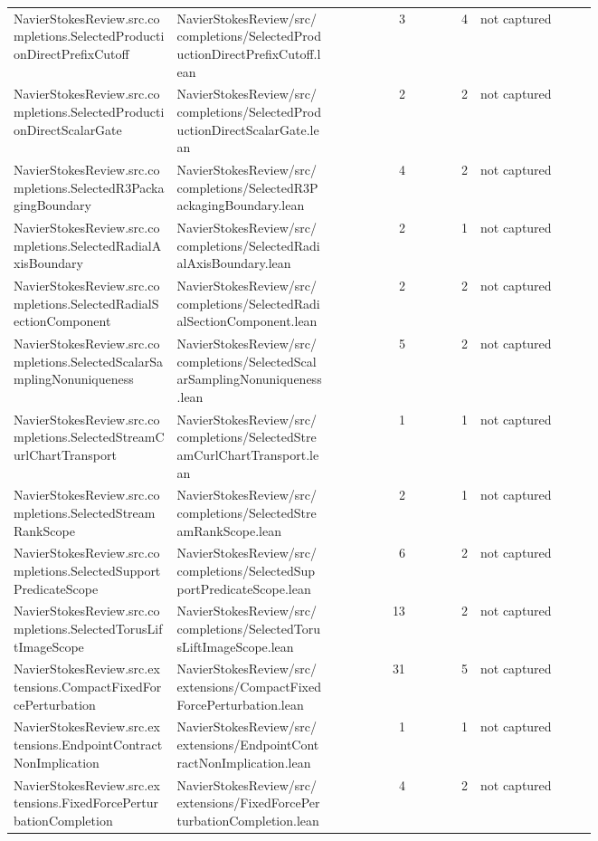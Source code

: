 \documentclass[10pt]{article}
\begin{document}
\begin{longtable}{p{0.28\linewidth}p{0.27\linewidth}r r p{0.20\linewidth}}
NavierStokesReview.src.completions.SelectedProductionDirectPrefixCutoff & NavierStokesReview/src/completions/SelectedProductionDirectPrefixCutoff.lean & 3 & 4 & not captured\\
NavierStokesReview.src.completions.SelectedProductionDirectScalarGate & NavierStokesReview/src/completions/SelectedProductionDirectScalarGate.lean & 2 & 2 & not captured\\
NavierStokesReview.src.completions.SelectedR3PackagingBoundary & NavierStokesReview/src/completions/SelectedR3PackagingBoundary.lean & 4 & 2 & not captured\\
NavierStokesReview.src.completions.SelectedRadialAxisBoundary & NavierStokesReview/src/completions/SelectedRadialAxisBoundary.lean & 2 & 1 & not captured\\
NavierStokesReview.src.completions.SelectedRadialSectionComponent & NavierStokesReview/src/completions/SelectedRadialSectionComponent.lean & 2 & 2 & not captured\\
NavierStokesReview.src.completions.SelectedScalarSamplingNonuniqueness & NavierStokesReview/src/completions/SelectedScalarSamplingNonuniqueness.lean & 5 & 2 & not captured\\
NavierStokesReview.src.completions.SelectedStreamCurlChartTransport & NavierStokesReview/src/completions/SelectedStreamCurlChartTransport.lean & 1 & 1 & not captured\\
NavierStokesReview.src.completions.SelectedStreamRankScope & NavierStokesReview/src/completions/SelectedStreamRankScope.lean & 2 & 1 & not captured\\
NavierStokesReview.src.completions.SelectedSupportPredicateScope & NavierStokesReview/src/completions/SelectedSupportPredicateScope.lean & 6 & 2 & not captured\\
NavierStokesReview.src.completions.SelectedTorusLiftImageScope & NavierStokesReview/src/completions/SelectedTorusLiftImageScope.lean & 13 & 2 & not captured\\
NavierStokesReview.src.extensions.CompactFixedForcePerturbation & NavierStokesReview/src/extensions/CompactFixedForcePerturbation.lean & 31 & 5 & not captured\\
NavierStokesReview.src.extensions.EndpointContractNonImplication & NavierStokesReview/src/extensions/EndpointContractNonImplication.lean & 1 & 1 & not captured\\
NavierStokesReview.src.extensions.FixedForcePerturbationCompletion & NavierStokesReview/src/extensions/FixedForcePerturbationCompletion.lean & 4 & 2 & not captured\\

\end{longtable}
\end{document}
